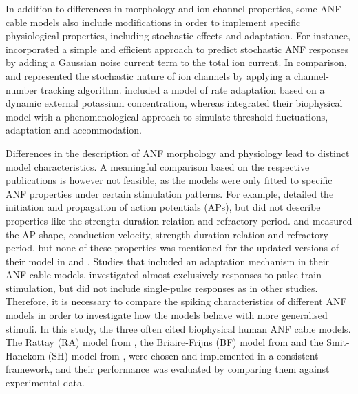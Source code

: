 \documentclass[utf8]{frontiersSCNS} %
\begin{document}
In addition to differences in morphology and ion channel properties, some ANF cable models also include modifications in order to implement specific physiological properties, including stochastic effects and adaptation. For instance, \cite{Rattay2001} incorporated a simple and efficient approach to predict stochastic ANF responses by adding a Gaussian noise current term to the total ion current. In comparison, \cite{Imennov2009} and \cite{Negm2014} represented the stochastic nature of ion channels by applying a channel-number tracking algorithm. \cite{Woo2010} included a model of rate adaptation based on a dynamic external potassium concentration, whereas \cite{VanGendt2016} integrated their biophysical model with a phenomenological approach to simulate threshold fluctuations, adaptation and accommodation.

Differences in the description of ANF morphology and physiology lead to distinct model characteristics. A meaningful comparison based on the respective publications is however not feasible, as the models were only fitted to specific ANF properties under certain stimulation patterns. For example, \cite{Rattay2001} detailed the initiation and propagation of action potentials (APs), but did not describe properties like the strength-duration relation and refractory period. \cite{Frijns1994} and \cite{Smit2008} measured the AP shape, conduction velocity, strength-duration relation and refractory period, but none of these properties was mentioned for the updated versions of their model in \cite{Briaire2005} and \cite{Smit2010}. Studies that included an adaptation mechanism in their ANF cable models, investigated almost exclusively responses to pulse-train stimulation, but did not include single-pulse responses as in other studies. Therefore, it is necessary to compare the spiking characteristics of different ANF models in order to investigate how the models behave with more generalised stimuli. In this study, the three often cited biophysical human ANF cable models. The Rattay (RA) model from \cite{Rattay2001}, the Briaire-Frijns (BF) model from \cite{Briaire2005} and the Smit-Hanekom (SH) model from \cite{Smit2010}, were chosen and implemented in a consistent framework, and their performance was evaluated by comparing them against experimental data.

\end{document}

